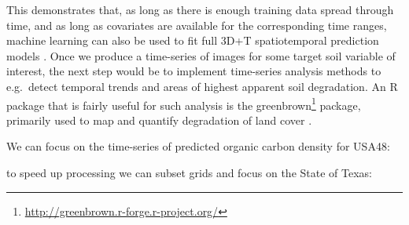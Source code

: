 \documentclass[graybox,natbib,nospthms,UStrade]{svmono}
\newenvironment{Shaded}{\begin{snugshade}}{\end{snugshade}}
\newcommand{\ControlFlowTok}[1]{\textcolor[rgb]{0.27,0.27,0.27}{\textbf{#1}}}
\newcommand{\DataTypeTok}[1]{\textcolor[rgb]{0.27,0.27,0.27}{#1}}
\newcommand{\DecValTok}[1]{\textcolor[rgb]{0.06,0.06,0.06}{#1}}
\newcommand{\ErrorTok}[1]{\textcolor[rgb]{0.14,0.14,0.14}{\textbf{#1}}}
\newcommand{\KeywordTok}[1]{\textcolor[rgb]{0.27,0.27,0.27}{\textbf{#1}}}
\newcommand{\NormalTok}[1]{#1}
\newcommand{\OperatorTok}[1]{\textcolor[rgb]{0.43,0.43,0.43}{\textbf{#1}}}
\newcommand{\OtherTok}[1]{\textcolor[rgb]{0.37,0.37,0.37}{#1}}
\newcommand{\StringTok}[1]{\textcolor[rgb]{0.5,0.5,0.5}{#1}}
\renewcommand{\href}[2]{#2 (\url{#1})}
\renewcommand{\href}[2]{#2\footnote{\url{#1}}}
\begin{document}
This demonstrates that, as long as there is enough training data spread through time, and as long as covariates are available for the corresponding time ranges, machine learning can also be used to fit full 3D+T spatiotemporal prediction models \citep{Gasch2015SPASTA}. Once we produce a time-series of images for some target soil variable of interest, the next step would be to implement time-series analysis methods to e.g.~detect temporal trends and areas of highest apparent soil degradation. An R package that is fairly useful for such analysis is the \href{http://greenbrown.r-forge.r-project.org/}{greenbrown} package, primarily used to map and quantify degradation of land cover \citep{forkel2015codominant}.

We can focus on the time-series of predicted organic carbon density for USA48:

\begin{Shaded}
\end{Shaded}

to speed up processing we can subset grids and focus on the State of Texas:
\end{document}
